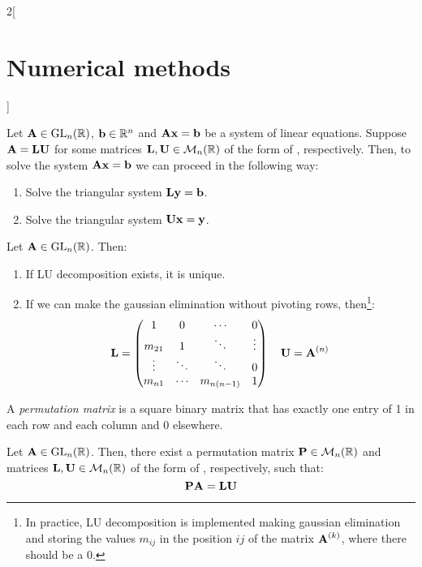 \documentclass[../../../main_math.tex]{subfiles}
\begin{document}
\begin{multicols}{2}[\section{Numerical methods}]
  \begin{lemma}
    Let $\boldsymbol{\mathrm{A}}\in\mathrm{GL}_n(\mathbb{R})$, $\boldsymbol{\mathrm{b}}\in\mathbb{R}^n$ and $\boldsymbol{\mathrm{A}}\boldsymbol{\mathrm{x}}=\boldsymbol{\mathrm{b}}$ be a system of linear equations. Suppose $\boldsymbol{\mathrm{A}}=\boldsymbol{\mathrm{L}}\boldsymbol{\mathrm{U}}$ for some matrices $\boldsymbol{\mathrm{L}},\boldsymbol{\mathrm{U}}\in\mathcal{M}_n(\mathbb{R})$ of the form of , respectively. Then, to solve the system $\boldsymbol{\mathrm{A}}\boldsymbol{\mathrm{x}}=\boldsymbol{\mathrm{b}}$ we can proceed in the following way:
    \begin{enumerate}
      \item Solve the triangular system $\boldsymbol{\mathrm{L}}\boldsymbol{\mathrm{y}}=\boldsymbol{\mathrm{b}}$.
      \item Solve the triangular system $\boldsymbol{\mathrm{U}}\boldsymbol{\mathrm{x}}=\boldsymbol{\mathrm{y}}$.
    \end{enumerate}
  \end{lemma}
  \begin{proposition}
    Let $\boldsymbol{\mathrm{A}}\in\mathrm{GL}_n(\mathbb{R})$. Then:
    \begin{enumerate}
      \item If LU decomposition exists, it is unique.
      \item If we can make the gaussian elimination without pivoting rows, then\footnote{In practice, LU decomposition is implemented making gaussian elimination and storing the values $m_{ij}$ in the position $ij$ of the matrix $\boldsymbol{\mathrm{A}}^{(k)}$, where there should be a 0.}:
            $$
              \boldsymbol{\mathrm{L}}=
              \begin{pmatrix}
                1      & 0      & \cdots     & 0      \\
                m_{21} & 1      & \ddots     & \vdots \\
                \vdots & \ddots & \ddots     & 0      \\
                m_{n1} & \cdots & m_{n(n-1)} & 1
              \end{pmatrix}\quad
              \boldsymbol{\mathrm{U}}=\boldsymbol{\mathrm{A}}^{(n)}
            $$
    \end{enumerate}
  \end{proposition}
  \begin{definition}
    A \emph{permutation matrix} is a square binary matrix that has exactly one entry of 1 in each row and each column and 0 elsewhere.
  \end{definition}
  \begin{proposition}
    Let $\boldsymbol{\mathrm{A}}\in\mathrm{GL}_n(\mathbb{R})$. Then, there exist a permutation matrix $\boldsymbol{\mathrm{P}}\in\mathcal{M}_n(\mathbb{R})$ and matrices $\boldsymbol{\mathrm{L}},\boldsymbol{\mathrm{U}}\in\mathcal{M}_n(\mathbb{R})$ of the form of , respectively, such that: $$\boldsymbol{\mathrm{P}}\boldsymbol{\mathrm{A}}=\boldsymbol{\mathrm{L}}\boldsymbol{\mathrm{U}}$$
  \end{proposition}
\end{multicols}
\end{document}
